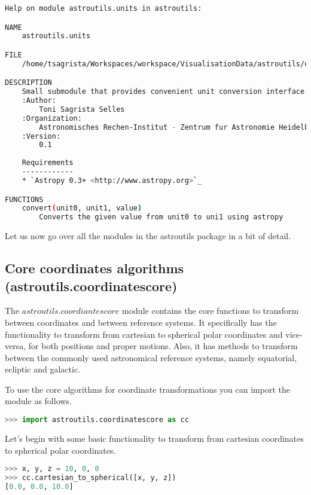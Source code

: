 \documentclass[
a4paper, %
11pt, %
onecolumn, %
openany, %
]{memoir}
\begin{document}
\begin{lstlisting}[language=bash,basicstyle={\tiny\ttfamily}]
Help on module astroutils.units in astroutils:

NAME
    astroutils.units

FILE
    /home/tsagrista/Workspaces/workspace/VisualisationData/astroutils/units.py

DESCRIPTION
    Small submodule that provides convenient unit conversion interface.
    :Author:
        Toni Sagrista Selles
    :Organization:
        Astronomisches Rechen-Institut - Zentrum fur Astronomie Heidelberg - UNIVERSITAT HEIDELBERG
    :Version:
        0.1
    
    Requirements
    ------------
    * `Astropy 0.3+ <http://www.astropy.org>`_

FUNCTIONS
    convert(unit0, unit1, value)
        Converts the given value from unit0 to uni1 using astropy
\end{lstlisting}

Let us now go over all the modules in the astroutils package in a bit of detail.

\subsection{Core coordinates algorithms (astroutils.coordinatescore)}

The $astroutils.coordiantescore$ module contains the core functions to transform between coordinates and between reference systems. It specifically
has the functionality to transform from cartesian to spherical polar coordinates and vice-versa, for both positions
and proper motions. Also, it has methods to transform between the commonly used astronomical reference systems, namely
equatorial, ecliptic and galactic.

To use the core algorithms for coordinate transformations you can import the module as follows.

\begin{lstlisting}[language=Python]
>>> import astroutils.coordinatescore as cc
\end{lstlisting}

Let's begin with some basic functionality to transform from cartesian coordinates to spherical polar coordinates.

\begin{lstlisting}[language=Python]
>>> x, y, z = 10, 0, 0
>>> cc.cartesian_to_spherical([x, y, z])
[0.0, 0.0, 10.0]
\end{lstlisting}
\end{document}
